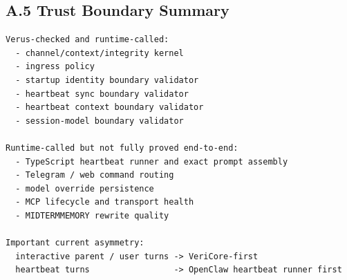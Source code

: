 \documentclass[11pt]{article}
\begin{document}
\subsection{A.5 Trust Boundary Summary}
\begin{lstlisting}[style=code]
Verus-checked and runtime-called:
  - channel/context/integrity kernel
  - ingress policy
  - startup identity boundary validator
  - heartbeat sync boundary validator
  - heartbeat context boundary validator
  - session-model boundary validator

Runtime-called but not fully proved end-to-end:
  - TypeScript heartbeat runner and exact prompt assembly
  - Telegram / web command routing
  - model override persistence
  - MCP lifecycle and transport health
  - MIDTERMMEMORY rewrite quality

Important current asymmetry:
  interactive parent / user turns -> VeriCore-first
  heartbeat turns                 -> OpenClaw heartbeat runner first
\end{lstlisting}
\end{document}
